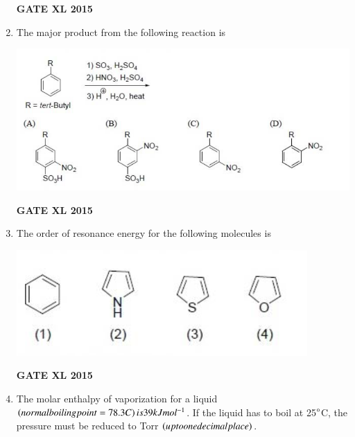 \documentclass[journal,12pt,onecolumn]{IEEEtran}
\begin{document}
\begin{enumerate}
\begin{flushright}\textbf{GATE XL 2015}\end{flushright}
\item The major product from the following reaction is
    
    \includegraphics[width=15cm]{22}
\begin{flushright}\textbf{GATE XL 2015}\end{flushright}
\item The order of resonance energy for the following molecules is
    
    \includegraphics{23}

	\begin{enumerate}
    \end{enumerate}
\begin{flushright}\textbf{GATE XL 2015}\end{flushright}
\item The molar enthalpy of vaporization for a liquid $\left(normal boiling point = 78.3 C\right) is 39 kJ mol^{-1}$. If the liquid has to boil at 25$\degree$C, the pressure must be reduced to Torr $\left(up to one decimal place\right)$.


\end{enumerate}
\end{document}
